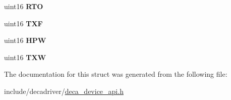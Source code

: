 \begin{DoxyCompactItemize}
\item 
\hypertarget{structdwt__deviceentcnts__t_a00f61509ebb982703c85b8c713849d89}{uint16 {\bfseries R\-T\-O}}\label{structdwt__deviceentcnts__t_a00f61509ebb982703c85b8c713849d89}

\item 
\hypertarget{structdwt__deviceentcnts__t_a158cce2581a33189ab79158eb5c90ff3}{uint16 {\bfseries T\-X\-F}}\label{structdwt__deviceentcnts__t_a158cce2581a33189ab79158eb5c90ff3}

\item 
\hypertarget{structdwt__deviceentcnts__t_a94042aacf11dc9d19480312f1e56267d}{uint16 {\bfseries H\-P\-W}}\label{structdwt__deviceentcnts__t_a94042aacf11dc9d19480312f1e56267d}

\item 
\hypertarget{structdwt__deviceentcnts__t_aaae5eba71cb905f334eb58b55191f48b}{uint16 {\bfseries T\-X\-W}}\label{structdwt__deviceentcnts__t_aaae5eba71cb905f334eb58b55191f48b}

\end{DoxyCompactItemize}


The documentation for this struct was generated from the following file\-:\begin{DoxyCompactItemize}
\item 
include/decadriver/\hyperlink{deca__device__api_8h}{deca\-\_\-device\-\_\-api.\-h}\end{DoxyCompactItemize}
